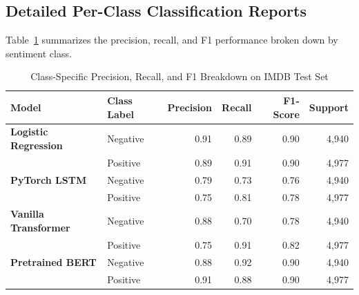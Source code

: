 \documentclass[12pt,a4paper]{report}
\begin{document}
\subsection{Detailed Per-Class Classification Reports}
Table~\ref{tab:exp7_class_reports} summarizes the precision, recall, and F1 performance broken down by sentiment class.
\begin{table}[H]
\centering
\small
\caption{Class-Specific Precision, Recall, and F1 Breakdown on IMDB Test Set}
\label{tab:exp7_class_reports}
\begin{tabular}{llrrrr}
\toprule
\textbf{Model} & \textbf{Class Label} & \textbf{Precision} & \textbf{Recall} & \textbf{F1-Score} & \textbf{Support} \\
\midrule
\textbf{Logistic Regression} & Negative & 0.91 & 0.89 & 0.90 & 4,940 \\
                             & Positive & 0.89 & 0.91 & 0.90 & 4,977 \\
\midrule
\textbf{PyTorch LSTM}        & Negative & 0.79 & 0.73 & 0.76 & 4,940 \\
                             & Positive & 0.75 & 0.81 & 0.78 & 4,977 \\
\midrule
\textbf{Vanilla Transformer} & Negative & 0.88 & 0.70 & 0.78 & 4,940 \\
                             & Positive & 0.75 & 0.91 & 0.82 & 4,977 \\
\midrule
\textbf{Pretrained BERT}     & Negative & 0.88 & 0.92 & 0.90 & 4,940 \\
                             & Positive & 0.91 & 0.88 & 0.90 & 4,977 \\
\bottomrule
\end{tabular}
\end{table}
\end{document}
